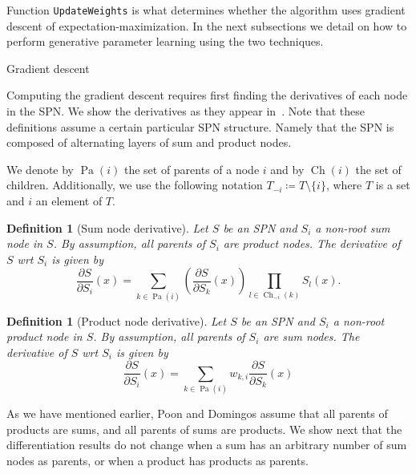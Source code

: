 \documentclass{amsart}
\makeatletter
\def\subsection{\@startsection{subsection}{3}%
  \z@{.5\linespacing\@plus.7\linespacing}{.1\linespacing}%
  {\normalfont}}
\DeclareMathOperator*{\Ch}{\text{Ch}}
\DeclareMathOperator*{\Pa}{\text{Pa}}
\theoremstyle{plain}
\newcounter{dummy-def}\numberwithin{dummy-def}{section}
\newtheorem{definition}[dummy-def]{Definition}
\newcounter{dummy-thm}\numberwithin{dummy-thm}{section}
\newcounter{dummy-prop}\numberwithin{dummy-prop}{section}
\newcounter{dummy-corollary}\numberwithin{dummy-corollary}{section}
\newcounter{dummy-lemma}\numberwithin{dummy-lemma}{section}
\newcounter{dummy-ex}\numberwithin{dummy-ex}{section}
\newcounter{dummy-eg}\numberwithin{dummy-eg}{section}
\numberwithin{equation}{section}
\newcommand{\code}[1]{\lstinline[mathescape=true]{#1}}
\makeatother
\begin{document}
Function \code{UpdateWeights} is what determines whether the algorithm uses gradient descent of
expectation-maximization. In the next subsections we detail on how to perform generative parameter
learning using the two techniques.

\subsection{Gradient descent}

Computing the gradient descent requires first finding the derivatives of each node in the SPN\@. We
show the derivatives as they appear in~\cite{poon-domingos}. Note that these definitions assume a
certain particular SPN structure. Namely that the SPN is composed of alternating layers of sum and
product nodes.

We denote by $\Pa(i)$ the set of parents of a node $i$ and by $\Ch(i)$ the set of children.
Additionally, we use the following notation $T_{-i}\coloneqq T\setminus\{i\}$, where $T$ is a set
and $i$ an element of $T$.

\begin{definition}[Sum node derivative]\label{def:sumdiff}
  Let $S$ be an SPN and $S_i$ a non-root sum node in $S$. By assumption, all parents of $S_i$ are
  product nodes. The derivative of $S$ wrt $S_i$ is given by
  \begin{equation*}
    \frac{\partial S}{\partial S_i}(x) = \sum_{k\in\Pa(i)}\left(\frac{\partial S}{\partial S_k}(x)
      \right)\prod_{l\in\Ch_{-i}(k)} S_l(x).
  \end{equation*}
\end{definition}

\begin{definition}[Product node derivative]\label{def:productdiff}
  Let $S$ be an SPN and $S_i$ a non-root product node in $S$. By assumption, all parents of $S_i$
  are sum nodes. The derivative of $S$ wrt $S_i$ is given by
  \begin{equation*}
    \frac{\partial S}{\partial S_i}(x) = \sum_{k\in\Pa(i)} w_{k,i}\frac{\partial S}{\partial
    S_k}(x)
  \end{equation*}
\end{definition}

As we have mentioned earlier, Poon and Domingos assume that all parents of products are sums, and
all parents of sums are products. We show next that the differentiation results do not change when
a sum has an arbitrary number of sum nodes as parents, or when a product has products as parents.
\end{document}

